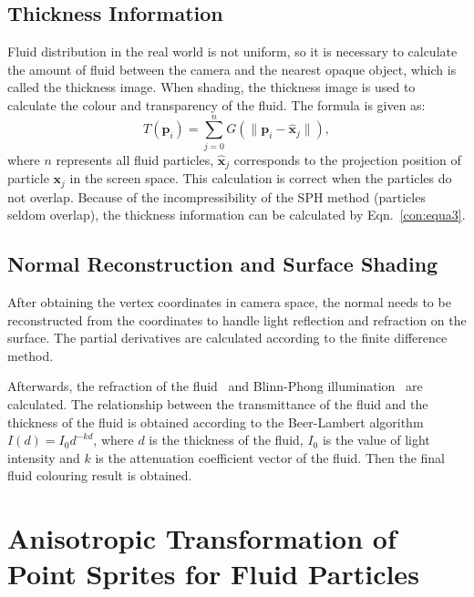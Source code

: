 \documentclass[times,twocolumn,final]{elsarticle}
\begin{document}
\subsection{Thickness Information}
Fluid distribution in the real world is not uniform, so it is necessary to calculate the amount of fluid between the camera and the nearest opaque object, which is called the thickness image. When shading, the thickness image is used to calculate the colour and transparency of the fluid\cite{ref:ref14}. The formula is given as:
\begin{equation}
    T(\mathbf{{p}}_i)=\sum_{j=0}^{n} G\left( \| \mathbf{{p}}_i - \mathbf{\hat{x}}_j \| \right), 
\label{con:equa3}
\end{equation}
where $n$ represents all fluid particles, $\mathbf{\hat{x}}_j$ corresponds to the projection position of particle $\mathbf{{x}}_j$ in the screen space. This calculation is correct when the particles do not overlap. Because of the incompressibility of the SPH method (particles seldom overlap), the thickness information can be calculated by Eqn.~\ref{con:equa3}.

\subsection{Normal Reconstruction and Surface Shading}
After obtaining the vertex coordinates in camera space, the normal needs to be reconstructed from the coordinates to handle light reflection and refraction on the surface. The partial derivatives are calculated according to the finite difference method.

Afterwards, the refraction of the fluid~\cite{ref:ref25} and Blinn-Phong illumination~\cite{ref:ref27} are calculated. The relationship between the transmittance of the fluid and the thickness of the fluid is obtained according to the Beer-Lambert algorithm\cite{ref:ref28} $I(d)=I_{0} d^{-k d}$, where $d$ is the thickness of the fluid, $I_0$ is the value of light intensity and $k$ is the attenuation coefficient vector of the fluid. Then the final fluid colouring result is obtained.

\section{Anisotropic Transformation of Point Sprites for Fluid Particles}
\end{document}
